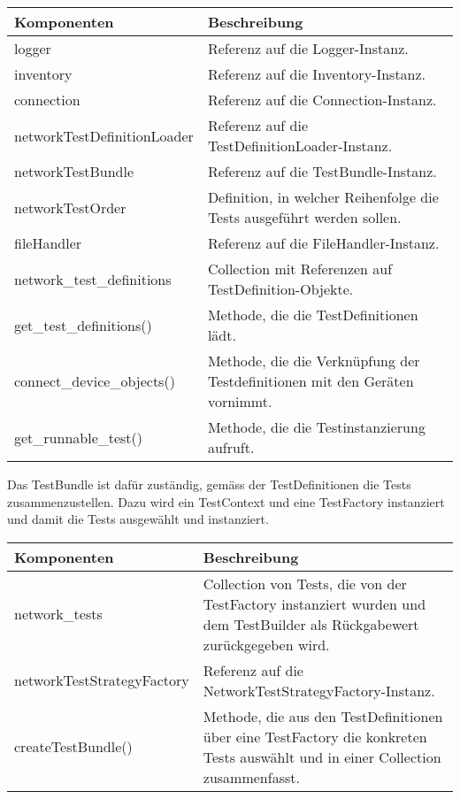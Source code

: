 \documentclass[]{subfiles}
\begin{document}
	\begin{tabularx}{\textwidth}{lX}
		\toprule
			Komponenten & Beschreibung \\
		\midrule
			logger & Referenz auf die Logger-Instanz.  \\
			inventory & Referenz auf die Inventory-Instanz. \\
			connection & Referenz auf die Connection-Instanz. \\
			networkTestDefinitionLoader & Referenz auf die TestDefinitionLoader-Instanz.\\
			networkTestBundle &  Referenz auf die TestBundle-Instanz. \\
			networkTestOrder & Definition, in welcher Reihenfolge die Tests ausgeführt werden sollen. \\
			fileHandler & Referenz auf die FileHandler-Instanz. \\
			network\_test\_definitions & Collection mit Referenzen auf TestDefinition-Objekte. \\
		\midrule
			get\_test\_definitions() & Methode, die die TestDefinitionen lädt. \\
			connect\_device\_objects() & Methode, die die Verknüpfung der Testdefinitionen mit den Geräten vornimmt. \\
			get\_runnable\_test() & Methode, die die Testinstanzierung aufruft. \\
		\bottomrule
	\end{tabularx}
	\newpage

	Das TestBundle ist dafür zuständig, gemäss der TestDefinitionen die Tests zusammenzustellen. 
	Dazu wird ein TestContext und eine TestFactory instanziert und damit die Tests ausgewählt und instanziert.

	\begin{tabularx}{\textwidth}{lX}
		\toprule
			Komponenten & Beschreibung \\
		\midrule
			network\_tests & Collection von Tests, die von der TestFactory instanziert wurden und dem TestBuilder als Rückgabewert zurückgegeben wird. \\
			networkTestStrategyFactory & Referenz auf die NetworkTestStrategyFactory-Instanz. \\
		\midrule
			createTestBundle() & Methode, die aus den TestDefinitionen über eine TestFactory die konkreten Tests auswählt und in einer Collection zusammenfasst. \\
		\bottomrule
	\end{tabularx}
\end{document}
